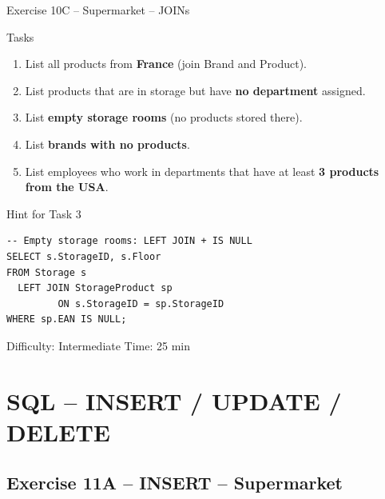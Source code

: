 \documentclass[10pt]{beamer}
\begin{document}
\begin{frame}[fragile]{Exercise 10C -- Supermarket -- JOINs}
  \begin{block}{Tasks}
    \begin{enumerate}
      \item List all products from \textbf{France} (join Brand and Product).
      \item List products that are in storage but have \textbf{no department} assigned.
      \item List \textbf{empty storage rooms} (no products stored there).
      \item List \textbf{brands with no products}.
      \item List employees who work in departments that have at least \textbf{3 products from the USA}.
    \end{enumerate}
  \end{block}

  \begin{block}{Hint for Task 3}
\begin{lstlisting}[style=sqlstyle]
-- Empty storage rooms: LEFT JOIN + IS NULL
SELECT s.StorageID, s.Floor
FROM Storage s
  LEFT JOIN StorageProduct sp
         ON s.StorageID = sp.StorageID
WHERE sp.EAN IS NULL;
\end{lstlisting}
  \end{block}

  \begin{alertblock}{Difficulty: Intermediate \quad Time: 25 min}
  \end{alertblock}
\end{frame}

\section{SQL -- INSERT / UPDATE / DELETE}

\subsection{Exercise 11A -- INSERT -- Supermarket}
\end{document}

